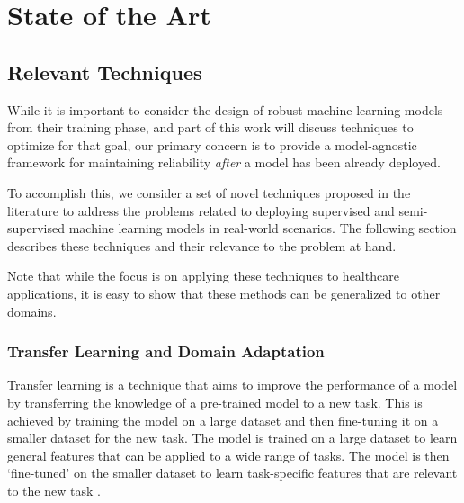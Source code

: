 \documentclass[../main.tex]{subfiles}
\begin{document}
    \chapter{State of the Art} \label{chap:state_of_the_art}

    \section{Relevant Techniques} \label{sec:relevant_techniques}

    While it is important to consider the design of robust machine learning models from their training phase, and part of this work will discuss techniques to optimize for that goal, our primary concern is to provide a model-agnostic framework for maintaining reliability \textit{after} a model has been already deployed.
    
    To accomplish this, we consider a set of novel techniques proposed in the literature to address the problems related to deploying supervised and semi-supervised machine learning models in real-world scenarios. The following section describes these techniques and their relevance to the problem at hand. 
    
    Note that while the focus is on applying these techniques to healthcare applications, it is easy to show that these methods can be generalized to other domains.

    

    \subsection{Transfer Learning and Domain Adaptation} \label{sec:transfer_learning}

    Transfer learning is a technique that aims to improve the performance of a model by transferring the knowledge of a pre-trained model to a new task. This is achieved by training the model on a large dataset and then fine-tuning it on a smaller dataset for the new task. The model is trained on a large dataset to learn general features that can be applied to a wide range of tasks. The model is then `fine-tuned' on the smaller dataset to learn task-specific features that are relevant to the new task \cite{pan_survey_2010}.
\end{document}
